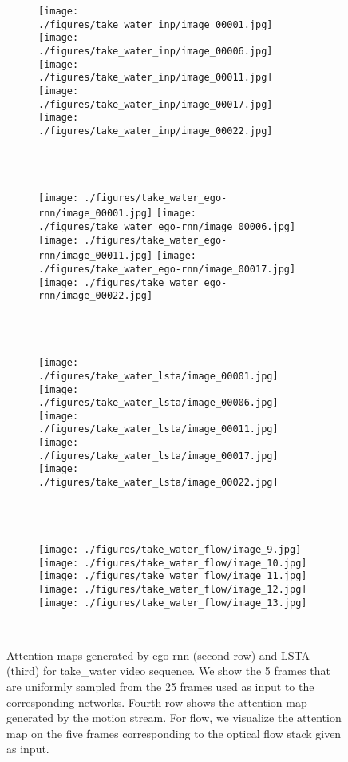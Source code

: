 \documentclass[10pt,twocolumn,letterpaper]{article}
\begin{document}
\begin{matrix*}[r]
	
\begin{figure*}[t]
	\centering      
	\begin{subfigure}[b]{0.95\textwidth}
		\texttt{[image: ./figures/take\_water\_inp/image\_00001.jpg]}
		\texttt{[image: ./figures/take\_water\_inp/image\_00006.jpg]}
		\texttt{[image: ./figures/take\_water\_inp/image\_00011.jpg]}
		\texttt{[image: ./figures/take\_water\_inp/image\_00017.jpg]}
		\texttt{[image: ./figures/take\_water\_inp/image\_00022.jpg]}
	\end{subfigure}\\ \vskip 2mm
	\ 
	\begin{subfigure}[b]{0.95\textwidth}
		\texttt{[image: ./figures/take\_water\_ego-rnn/image\_00001.jpg]}
		\texttt{[image: ./figures/take\_water\_ego-rnn/image\_00006.jpg]}
		\texttt{[image: ./figures/take\_water\_ego-rnn/image\_00011.jpg]}
		\texttt{[image: ./figures/take\_water\_ego-rnn/image\_00017.jpg]}
		\texttt{[image: ./figures/take\_water\_ego-rnn/image\_00022.jpg]}
	\end{subfigure}\\ \vskip 2mm
	\ 
	\begin{subfigure}[b]{0.95\textwidth}
		\texttt{[image: ./figures/take\_water\_lsta/image\_00001.jpg]}
		\texttt{[image: ./figures/take\_water\_lsta/image\_00006.jpg]}
		\texttt{[image: ./figures/take\_water\_lsta/image\_00011.jpg]}
		\texttt{[image: ./figures/take\_water\_lsta/image\_00017.jpg]}
		\texttt{[image: ./figures/take\_water\_lsta/image\_00022.jpg]}
	\end{subfigure}\\ \vskip 2mm	       
	\ 
	\begin{subfigure}[b]{0.95\textwidth}
		\texttt{[image: ./figures/take\_water\_flow/image\_9.jpg]}
		\texttt{[image: ./figures/take\_water\_flow/image\_10.jpg]}
		\texttt{[image: ./figures/take\_water\_flow/image\_11.jpg]}
		\texttt{[image: ./figures/take\_water\_flow/image\_12.jpg]}
		\texttt{[image: ./figures/take\_water\_flow/image\_13.jpg]}
	\end{subfigure}\\ \vskip 2mm			 
	\caption{Attention maps generated by ego-rnn (second row) and LSTA (third) for take\_water video sequence. We show the 5 frames that are uniformly sampled from the 25 frames used as input to the corresponding networks. Fourth row shows the attention map generated by the motion stream. For flow, we visualize the attention map on the five frames corresponding to the optical flow stack given as input.}
	\label{fig:att_map_take_water}
\end{figure*}
	

\end{matrix*}
\end{document}
